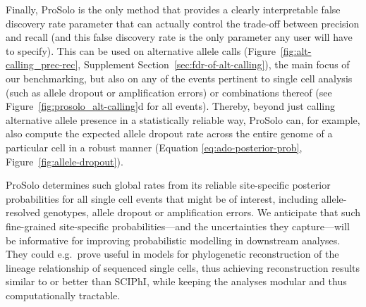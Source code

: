 \documentclass[12pt,inline]{wlscirep}
\begin{document}
Finally, ProSolo is the only method that provides a clearly interpretable false discovery rate parameter that can actually control the trade-off between precision and recall (and this false discovery rate is the only parameter any user will have to specify).
This can be used on alternative allele calls (Figure~\ref{fig:alt-calling_prec-rec}, Supplement Section~\ref{sec:fdr-of-alt-calling}), the main focus of our benchmarking, but also on any of the events pertinent to single cell analysis (such as allele dropout or amplification errors) or combinations thereof (see Figure~\ref{fig:prosolo_alt-calling}d for all events).
Thereby, beyond just calling alternative allele presence in a statistically reliable way, ProSolo can, for example, also compute the expected allele dropout rate across the entire genome of a particular cell in a robust manner (Equation \ref{eq:ado-posterior-prob}, Figure~\ref{fig:allele-dropout}).

ProSolo determines such global rates from its reliable site-specific posterior probabilities for all single cell events that might be of interest, including allele-resolved genotypes, allele dropout or amplification errors. 
We anticipate that such fine-grained site-specific probabilities---and the uncertainties they capture---will be informative for improving probabilistic modelling in downstream analyses.
They could e.g.~prove useful in models for phylogenetic reconstruction of the lineage relationship of sequenced single cells\cite{singer_single-cell_2018,zafar_siclonefit:_2018,koptagel_scuphr:_2018}, thus achieving reconstruction results similar to or better than SCIPhI, while keeping the analyses modular and thus computationally tractable\cite{lahnemann_eleven_2020}.
\end{document}

